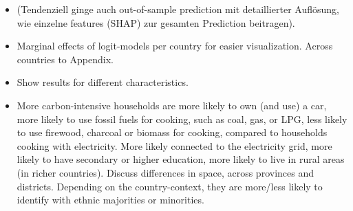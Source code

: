 \documentclass[12pt, a4paper]{article}
\begin{document}
\begin{itemize}
    \item (Tendenziell ginge auch out-of-sample prediction mit detaillierter Auflösung, wie einzelne features (SHAP) zur gesamten Prediction beitragen).
    \item Marginal effects of logit-models per country for easier visualization. Across countries to Appendix.
    \item Show results for different characteristics.
  \item More carbon-intensive households are more likely to own (and use) a car, more likely to use fossil fuels for cooking, such as coal, gas, or LPG, less likely to use firewood, charcoal or biomass for cooking, compared to households cooking with electricity. More likely connected to the electricity grid, more likely to have secondary or higher education, more likely to live in rural areas (in richer countries). Discuss differences in space, across provinces and districts. Depending on the country-context, they are more/less likely to identify with ethnic majorities or minorities.

\end{itemize}
\end{document}
